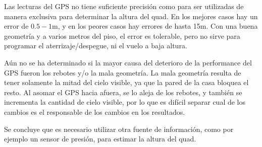 \documentclass[spanish,12pt,a4paper,titlepage]{report}
\begin{document}
Las lecturas del GPS no tiene suficiente precisión como para ser utilizadas de manera exclusiva para determinar la altura del quad. En los mejores casos hay un error de $0.5-1$m, y en los peores casos hay errores de hasta 15m. Con una buena geometría y a varios metros del piso, el error es tolerable, pero no sirve para programar el aterrizaje/despegue, ni el vuelo a baja altura.

Aún no se ha determinado si la mayor causa del deterioro de la performance del GPS fueron los rebotes y/o la mala geometría. La mala geometría resulta de tener solamente la mitad del cielo visible, ya que la pared de la casa bloquea el resto. Al asomar el GPS hacia afuera, se lo aleja de los rebotes, y también se incrementa la cantidad de cielo visible, por lo que es difícil separar cual de los cambios es el responsable de los cambios en los resultados.

Se concluye que es necesario utilizar otra fuente de información, como por ejemplo un sensor de presión, para estimar la altura del quad.


%
%
%
%
%
\end{document}
